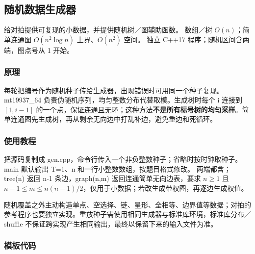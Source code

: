 \subsection{随机数据生成器}
\label{other:generator}
\AlgorithmInfo
    {给对拍提供可复现的小数据，并提供随机树／图辅助函数。}
    {数组／树 $O(n)$；简单连通图 $O(n^2\log n)$ 上界、$O(n^2)$ 空间。}
    {独立 C++17 程序；随机区间含两端，图点号从 1 开始。}
\subsubsection*{原理}
每轮把编号作为随机种子传给生成器，出现错误时可用同一个种子复现。mt19937\_64 负责伪随机序列，均匀整数分布代替取模。生成树时每个 i 连接到 $[1,i-1]$ 的一个点，保证连通且无环；这种方法\textbf{不是所有标号树的均匀采样}。简单连通图先生成树，再从剩余无向边中打乱补边，避免重边和死循环。
\subsubsection*{使用教程}
把源码复制成 gen.cpp，命令行传入一个非负整数种子；省略时按时钟取种子。main 默认输出 T=1、n 和一行小整数数组，按题目格式修改。 两端都含；tree(n) 返回 n-1 条边，graph(n,m) 返回连通简单无向边表，要求 $n\ge1$ 且 $n-1\le m\le n(n-1)/2$，仅用于小数据；若改生成带权图，再逐边生成权值。

随机覆盖之外主动构造单点、空选择、链、星形、全相等、边界值等数据；对拍的参考程序也要独立实现。重放种子需使用相同生成器与标准库环境，标准库分布／shuffle 不保证跨实现产生相同输出，最终以保留下来的输入文件为准。
\subsubsection*{模板代码}

